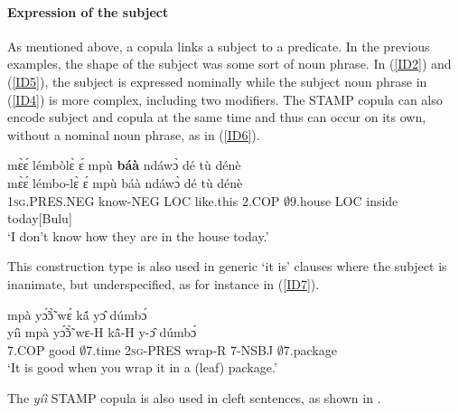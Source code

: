 \paragraph{Expression of the subject} As mentioned above, a copula links a subject to a predicate. In the previous examples, the shape of the subject was some sort of noun phrase. In (\ref{ID2}) and (\ref{ID5}), the subject is expressed nominally while the subject noun phrase in (\ref{ID4}) is more complex, including two modifiers. The STAMP copula can also encode subject and copula at the same time and thus can occur on its own, without a nominal noun phrase, as in (\ref{ID6}).


\begin{exe} 
\ex\label{ID6}
  \glll mɛ̀ɛ́ lémbòlɛ̀ ɛ́ mpù {\bfseries báà} ndáwɔ̀ dé tù dénè \\
      mɛ̀ɛ́ lémbo-lɛ̀ ɛ́ mpù báà ndáwɔ̀ dé tù dénè \\
        1\textsc{sg}.PRES.NEG know-NEG LOC like.this 2.COP $\emptyset$9.house LOC inside today[Bulu]  \\
    \trans `I don't know how they are in the house today.'
\end{exe}


\noindent This construction type is also used in generic `it is' clauses where the subject is inanimate, but underspecified, as for instance in (\ref{ID7}).

\begin{exe} 
\ex\label{ID7}
   mpà yɔ̃́ɔ̃̀ wɛ́ kã́ yɔ̂ dúmbɔ́ \\
       yíì mpà yɔ̃́ɔ̃̀ wɛ-H kã̂-H y-ɔ̂ dúmbɔ́ \\
         7.COP good $\emptyset$7.time 2\textsc{sg}-PRES wrap-R 7-NSBJ $\emptyset$7.package\\ 
    \trans `It is good when you wrap it in a (leaf) package.'
\end{exe}

\noindent The {\itshape yíì} STAMP copula is also used in cleft sentences, as shown in .






